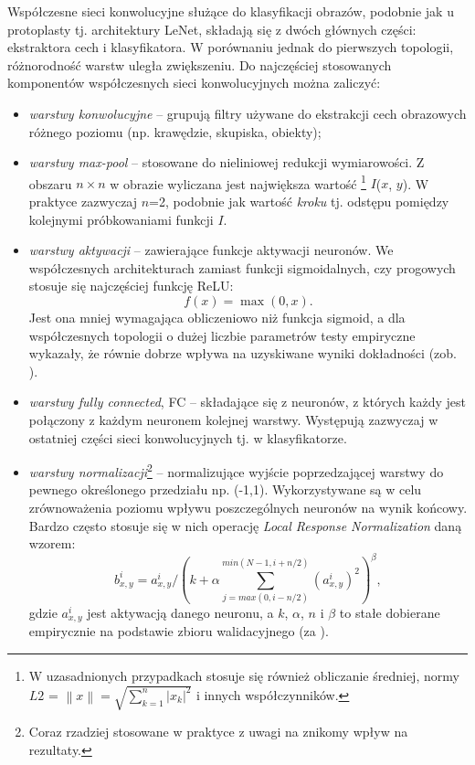 Współczesne sieci konwolucyjne służące do klasyfikacji obrazów, podobnie jak u protoplasty tj. architektury LeNet, składają się z dwóch głównych części: ekstraktora cech i klasyfikatora. W porównaniu jednak do pierwszych topologii, różnorodność warstw uległa zwiększeniu. Do najczęściej stosowanych komponentów współczesnych sieci konwolucyjnych można zaliczyć:
\begin{itemize}
	\item \textit{warstwy konwolucyjne} -- grupują filtry używane do ekstrakcji cech obrazowych różnego poziomu (np. krawędzie, skupiska, obiekty);
	\item \textit{warstwy max-pool} -- stosowane do nieliniowej redukcji wymiarowości. Z obszaru $n\times$$n$ w obrazie wyliczana jest największa wartość \footnote{W uzasadnionych przypadkach stosuje się również obliczanie średniej, normy $L2$ = $\left \| x \right \| = \sqrt{\sum_{k=1}^{n}\left |x_k  \right |^2}$ i innych współczynników.} $I$($x$, $y$). W praktyce zazwyczaj $n$=2, podobnie jak wartość \textit{kroku} tj. odstępu pomiędzy kolejnymi próbkowaniami funkcji $I$.
	\item \textit{warstwy aktywacji} -- zawierające funkcje aktywacji neuronów. We współczesnych architekturach zamiast funkcji sigmoidalnych, czy progowych stosuje się najczęściej funkcję ReLU:
	\begin{equation}
		f(x) = \max(0, x).
	\end{equation}
	Jest ona mniej wymagająca obliczeniowo niż funkcja sigmoid, a dla współczesnych topologii o dużej liczbie parametrów testy empiryczne wykazały, że równie dobrze wpływa na uzyskiwane wyniki dokładności (zob. \cite{Krizhevsky2012}). 
	\item \textit{warstwy fully connected}, FC -- składające się z neuronów, z których każdy jest połączony z każdym neuronem kolejnej warstwy. Występują zazwyczaj w ostatniej części sieci konwolucyjnych tj. w klasyfikatorze.
	\item \textit{warstwy normalizacji}\footnote{Coraz rzadziej stosowane w praktyce z uwagi na znikomy wpływ na rezultaty.} -- normalizujące wyjście poprzedzającej warstwy do pewnego określonego przedziału np. (-1,1). Wykorzystywane są w celu zrównoważenia poziomu wpływu poszczególnych neuronów na wynik końcowy. Bardzo często stosuje się w nich operację \textit{Local Response Normalization} daną wzorem:
	\begin{equation}
	\label{DLnormEquation}
	b_{x,y}^{i} = a_{x,y}^{i}/\left ( k + \alpha \sum_{j=max(0,i-n/2)}^{min(N-1,i+n/2)}(a_{x,y}^{i})^2 \right )^\beta,
	\end{equation}
	gdzie $a_{x,y}^{i}$ jest aktywacją danego neuronu, a $k$, $\alpha$, $n$ i $\beta$ to stałe dobierane empirycznie na podstawie zbioru walidacyjnego (za \cite{Krizhevsky2012}).
\end{itemize}

